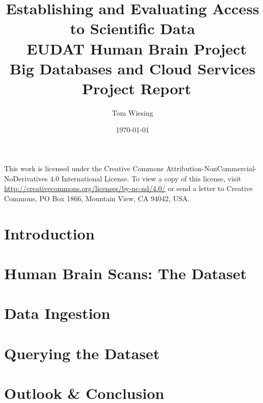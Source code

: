 \documentclass{article}
\title{Establishing and Evaluating Access to Scientific Data \\ EUDAT Human Brain Project \\ Big Databases and Cloud Services \\ Project Report}
\author{Tom Wiesing}
\date{\today}
\begin{document}
	
	\maketitle
	

	\newpage
	
	\tableofcontents
	
	
	\vspace{\fill}\noindent	
	This work is licensed under the Creative Commons Attribution-NonCommercial-NoDerivatives 4.0 International License. To view a copy of this license, visit \url{http://creativecommons.org/licenses/by-nc-nd/4.0/} or send a letter to Creative Commons, PO Box 1866, Mountain View, CA 94042, USA. 
	\newpage
	
	\section{Introduction}
	
	
	\section{Human Brain Scans: The Dataset}
	
	
	\section{Data Ingestion}
	
	
	\section{Querying the Dataset}
	
		
	\section{Outlook \& Conclusion}
	
	
	\printbibliography
\end{document}
